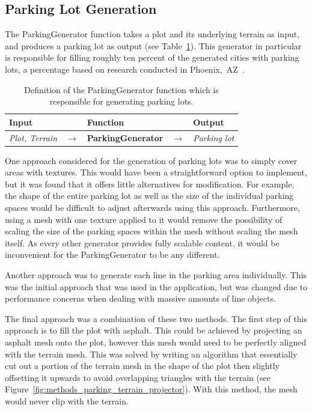 \subsection{Parking Lot Generation}

The ParkingGenerator function takes a plot and its underlying terrain as input, and produces a parking lot as output (see Table~\ref{table:parking}).
This generator in particular is responsible for filling roughly ten percent of the generated cities with parking lots, a percentage based on research conducted in Phoenix,~AZ~\cite{parking_percent}.

\begin{table}[H]
   \centering
   \begin{tabular}{lllll}
     \textbf{Input}                           &               & \textbf{Function}            &               & \textbf{Output}         \\
     \midrule
     \textit{Plot, Terrain}                   & $\rightarrow$ & \textbf{ParkingGenerator}       & $\rightarrow$ & \textit{Parking lot}           \\
     \bottomrule
   \end{tabular}

   \caption{Definition of the ParkingGenerator function which is responsible for generating parking lots.}
   \label{table:parking}
 \end{table}
 \vspace{-0.4cm}

One approach considered for the generation of parking lots was to simply cover areas with textures.
This would have been a straightforward option to implement, but it was found that it offers little alternatives for modification.
For example, the shape of the entire parking lot as well as the size of the individual parking spaces would be difficult to adjust afterwards using this approach.
Furthermore, using a mesh with one texture applied to it would remove the possibility of scaling the size of the parking spaces within the mesh without scaling the mesh itself.
As every other generator provides fully scalable content, it would be inconvenient for the ParkingGenerator to be any different.

Another approach was to generate each line in the parking area individually. 
This was the initial approach that was used in the application, but was changed due to performance concerns when dealing with massive amounts of line objects.

The final approach was a combination of these two methods.
The first step of this approach is to fill the plot with asphalt.
This could be achieved by projecting an asphalt mesh onto the plot, however this mesh would need to be perfectly aligned with the terrain mesh.
This was solved by writing an algorithm that essentially cut out a portion of the terrain mesh in the shape of the plot then slightly offsetting it upwards to avoid overlapping triangles with the terrain (see Figure~\ref{fig:methods_parking_terrain_projector}).
With this method, the mesh would never clip with the terrain.

